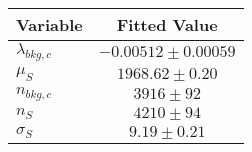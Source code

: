 \begin{tabular}[t]{lc}
\hline
Variable &Fitted Value\\
\hline\hline
$\lambda_{bkg,c}$&$-0.00512\pm0.00059$\\
\hline
$\mu_{S}$&$1968.62\pm0.20$\\
\hline
$n_{bkg,c}$&$3916\pm92$\\
\hline
$n_{S}$&$4210\pm94$\\
\hline
$\sigma_{S}$&$9.19\pm0.21$\\
\hline
\end{tabular}